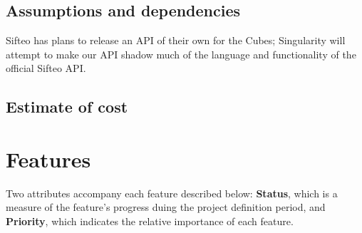 \documentclass[12pt]{article}
\begin{document}
              \subsection{Assumptions and dependencies}
              Sifteo has plans to release an API of their own for the Cubes; Singularity will attempt to make our API shadow much of the language and functionality of the official Sifteo API. 

              \subsection{Estimate of cost}
\clearpage

\section{Features}
Two attributes accompany each feature described below: \textbf{Status}, which is a measure of the feature's progress duing the project definition period, and \textbf{Priority}, which indicates the relative importance of each feature.
\end{document}
